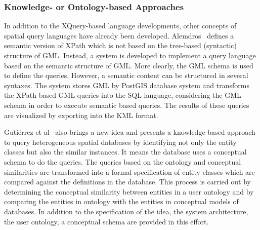 \documentclass[a4paper,12pt]{article}
\begin{document}



\subsubsection{Knowledge- or Ontology-based Approaches}
\label{ontology}
In addition to the XQuery-based language developments, 
other concepts of spatial query languages have already been developed. 
Alemdros~\cite{Alemdros2011, Alemdros2013} defines a semantic version of XPath 
which is not based on the tree-based (syntactic) structure of GML. Instead, a system is developed to implement a query language based on the semantic structure of GML. More clearly, the GML schema is used to define the queries. However, a semantic content can be structured in several syntaxes. The system stores GML by PostGIS database system and transforms the XPath-based GML queries into the SQL language, considering the GML schema in order to execute semantic based queries. The results of these queries are visualized by exporting into the KML format.

{Gutiérrez et al}~\cite{Gutierrez2004} also brings a new idea and presents a knowledge-based approach 
to query heterogeneous spatial databases by identifying not only the entity classes but also the similar instances. 
It means the database uses a conceptual schema to do the queries. 
The queries based on the ontology and conceptual similarities 
are transformed into a formal specification of entity classes 
which are compared against the definitions in the database. 
This process is carried out by determining the conceptual similarity between entities in a user ontology 
and by comparing the entities in ontology with the entities in conceptual models of databases. 
In addition to the specification of the idea, the system architecture, the user ontology, 
a conceptual schema are provided in this effort.
\end{document}
